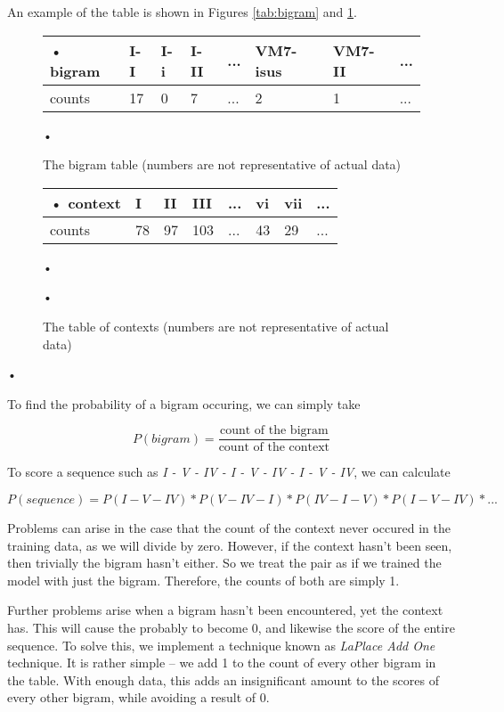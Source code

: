 ﻿\documentclass{article}
\begin{document}
An example of the table is shown in Figures \ref{tab:bigram} and \ref{tab:context}.

	\begin{figure}[h]

	\begin{center}
		\begin{tabular}{l | l | l | l | l | l | l | l}
•		bigram &	I-I 	& I-i	& I-II	& ...	& VM7-isus	& VM7-II	& ... \\ \hline
		counts & 17	& 0	& 7	& ...	& 2			& 1		& ... \\
		\end{tabular}•
	\end{center}
	\caption{The bigram table (numbers are not representative of actual data)}
	\label{tab:bigram}

	
	\begin{center}
		\begin{tabular}{l|l|l|l|l|l|l|l}
•		context	&	I 	&	II	&	III	&	...	&	vi	&	vii	&	...	\\[0.3em] \hline
		counts	&	78	&	97	&	103	&	...	&	43	&	29	&	...	\\
		\end{tabular}•
	\end{center}•
	\caption{The table of contexts (numbers are not representative of actual data)}
	\label{tab:context}
	\end{figure}•

To find the probability of a bigram occuring, we can simply take

	\[
	P(bigram) = \frac{\text{count of the bigram}}{\text{count of the context}}
	\]

To score a sequence such as \emph{I - V - IV - I - V - IV - I - V - IV}, we can calculate

	\[
	P(sequence) = P(I - V - IV) * P(V - IV - I) * P(IV - I - V) * P(I - V - IV) * ...
	\]

Problems can arise in the case that the count of the context never occured
in the training data,
as we will divide by zero. However, if the context hasn't been seen, then
trivially the bigram hasn't either. So we treat the pair as if we trained the
model with just the bigram. Therefore, the counts of both are simply 1.

Further problems arise when a bigram hasn't been encountered, yet the 
context has. This will cause the probably to become 0, and likewise the
score of the entire sequence. To solve this, we implement a technique 
known as \emph{LaPlace Add One} technique. It is rather simple -- we add
1 to the count of every other bigram in the table. With enough data, this
adds an insignificant amount to the scores of every other bigram,
while avoiding a result of 0.
\end{document}
